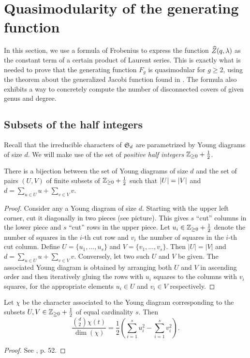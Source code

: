 \section{Quasimodularity of the generating function}

In this section, we use a formula of Frobenius to express the function $\widehat{Z}(q,\lambda)$ as the constant term of a certain product of Laurent series. This is exactly what is needed to prove that the generating function $F_g$ is quasimodular for $g\geq 2$, using the theorem about the generalized Jacobi function found in \cite{Kaneko-Zagier1995}. The formula also exhibits a way to concretely compute the number of disconnected covers of given genus and degree.

\subsection{Subsets of the half integers}

Recall that the irreducible characters of $\operatorname{\mathfrak{S}}_d$ are parametrized by Young diagrams of size $d$. %
We will make use of the set of \emph{positive half integers} $\mathbb{Z}_{\geq 0}+\frac{1}{2}$.

\begin{prop} \label{prop:bijection-young}
 There is a bijection between the set of Young diagrams of size $d$ and the set of pairs $(U,V)$ of finite subsets of $\mathbb{Z}_{\geq 0}+\frac{1}{2}$ such that $|U|=|V|$ and $d=\sum_{u\in U}u + \sum_{v\in V}v$.
\end{prop}

\begin{proof}
 Consider any a Young diagram of size $d$. Starting with the upper left corner, cut it diagonally in two pieces (see picture). This gives $s$ ``cut'' columns in the lower piece and $s$ ``cut'' rows in the upper piece. Let $u_i\in\mathbb{Z}_{\geq 0}+\frac{1}{2}$ denote the number of squares in the $i$-th cut row and $v_i$ the number of squares in the $i$-th cut column. Define $U=\{u_1,\dotsc,u_s\}$ and $V=\{v_1,\dotsc,v_s\}$. Then $|U|=|V|$ and $d=\sum_{u\in U}u + \sum_{v\in V}v$. Conversely, let two such $U$ and $V$ be given. The associated Young diagram is obtained by arranging both $U$ and $V$ in ascending order and then iteratively gluing the rows with $u_i$ squares to the columns with $v_i$ squares, for the appropriate elements $u_i \in U$ and $v_i \in V$ respectively.
\end{proof}

\begin{prop} \label{prop:frobenius-formula}
 Let $\chi$ be the character associated to the Young diagram corresponding to the subsets $U,V\in\mathbb{Z}_{\geq 0}+\frac{1}{2}$ of equal cardinality $s$. Then
 \[
  \frac{\binom{d}{2} \chi(t)}{\dim(\chi)} = \frac{1}{2}\left(\sum_{i=1}^s u_i^2 - \sum_{i=1}^s v_i^2\right).
 \]
\end{prop}
\begin{proof}
 See \cite{Fulton-Harris91}, p. 52.
\end{proof}

